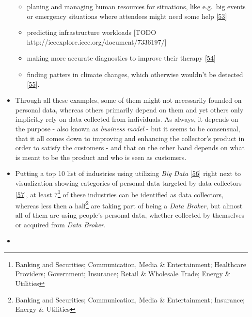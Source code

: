 \documentclass[12pt,english,a4paper,titlepage,cleardoublepage=empty,dottedtoc]{report}
\providecommand{\tightlist}{%
  \setlength{\itemsep}{0pt}\setlength{\parskip}{0pt}}
\begin{document}
\begin{itemize}
  \begin{itemize}
  \tightlist
  \item
    planing and managing human resources for situations, like e.g.~big
    events or emergency situations where attendees might need some help
    {[}\protect\hyperlink{ref-estimating-the-locations-of-emergency-events-from-twitter-streams_2014}{53}{]}
  \item
    predicting infrastructure workloads {[}TODO
    http://ieeexplore.ieee.org/document/7336197/{]}
  \item
    making more accurate diagnostics to improve their therapy
    {[}\protect\hyperlink{ref-the-practice-of-predictive-analytics-in-healthcare_2013}{54}{]}
  \item
    finding patters in climate changes, which otherwise wouldn't be
    detected
    {[}\protect\hyperlink{ref-data-collection-for-climate-changes_2014}{55}{]}.
  \end{itemize}
\item
  Through all these examples, some of them might not necessarily founded
  on personal data, whereas others primarily depend on them and yet
  others only implicitly rely on data collected from individuals. As
  always, it depends on the purpose - also known as \emph{business
  model} - but it seems to be consensual, that it all comes down to
  improving and enhancing the collector's product in order to satisfy
  the customers - and that on the other hand depends on what is meant to
  be the product and who is seen as customers.
\item
  Putting a top 10 list of industries using utilizing \emph{Big Data}
  {[}\protect\hyperlink{ref-graphic_2015_applications-of-big-data-in-10-industry-verticals}{56}{]}
  right next to visualization showing categories of personal data
  targeted by data collectors\\
  {[}\protect\hyperlink{ref-graphic_2012_personal-data-ecosystem}{57}{]},
  at least 7\footnote{Banking and Securities; Communication, Media \&
    Entertainment; Healthcare Providers; Government; Insurance; Retail
    \& Wholesale Trade; Energy \& Utilities} of these industries can be
  identified as data collectors, whereas less then a half\footnote{Banking
    and Securities; Communication, Media \& Entertainment; Insurance;
    Energy \& Utilities} are taking part of being a \emph{Data Broker},
  but almost all of them are using people's personal data, whether
  collected by themselves or acquired from \emph{Data Broker}.
\item

\end{itemize}
\end{document}
